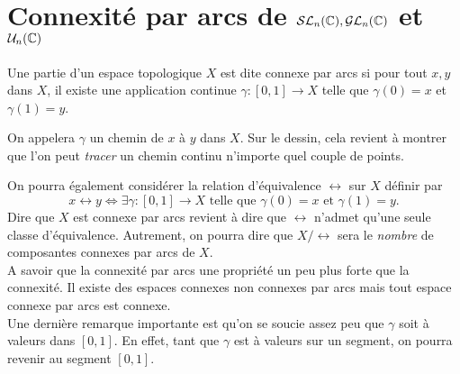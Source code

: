 \documentclass[../main.tex]{subfiles}
\begin{document}
\section{Connexité par arcs de \(\mathcal{SL}_n(\mathbb{C}), \mathcal{GL}_n(\mathbb{C})\) et \(\mathcal{U}_n(\mathbb{C})\)}
\begin{definition}
Une partie d'un espace topologique \(X\) est dite connexe par arcs si pour tout \(x,y\) dans \(X\), il existe
une application continue \(\gamma:[0,1]\to X\) telle que \(\gamma(0)=x\) et \(\gamma(1)=y\).
\begin{remark} On appelera \(\gamma\) un chemin de \(x\) à \(y\) dans \(X\). Sur le dessin, cela revient 
    à montrer que l'on peut \textit{tracer} un chemin continu n'importe quel couple de points.
\end{remark}
\end{definition}
On pourra également considérer la relation d'équivalence \(\longleftrightarrow\) sur \(X\) définir par
\begin{equation}
    x\longleftrightarrow y \iff \exists \gamma:[0,1]\to X \text{ telle que } \gamma(0) = x \text{ et } \gamma(1) = y.
\end{equation}
Dire que \(X\) est connexe par arcs revient à dire que \(\longleftrightarrow\) n'admet qu'une seule classe d'équivalence.
Autrement, on pourra dire que \(X/\longleftrightarrow\) sera le \textit{nombre} de composantes connexes par arcs de \(X\).\\

A savoir que la connexité par arcs une propriété un peu plus forte que la connexité. Il existe des espaces connexes non connexes par arcs mais tout espace connexe par arcs est connexe.\\

Une dernière remarque importante est qu'on se soucie assez peu que \(\gamma\) soit à valeurs dans \([0,1]\). En effet, tant que \(\gamma\) est à valeurs sur un segment, on pourra revenir au segment \([0,1]\).\\
\end{document}
